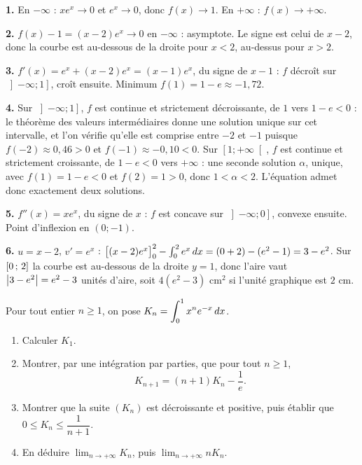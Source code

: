 \begin{corrige}
\textbf{1.} En $-\infty$ : $xe^{x} \to 0$ et $e^{x} \to 0$, donc
$f(x) \to 1$. En $+\infty$ : $f(x) \to +\infty$.

\textbf{2.} $f(x)-1 = (x-2)e^{x} \to 0$ en $-\infty$ : asymptote. Le signe est
celui de $x-2$, donc la courbe est au-dessous de la droite pour $x<2$,
au-dessus pour $x>2$.

\textbf{3.} $f'(x) = e^{x} + (x-2)e^{x} = (x-1)e^{x}$, du signe de $x-1$ :
$f$ décroît sur $\left]-\infty;1\right]$, croît ensuite. Minimum
$f(1) = 1-e \approx -1{,}72$.

\textbf{4.} Sur $\left]-\infty;1\right]$, $f$ est continue et strictement
décroissante, de $1$ vers $1-e < 0$ : le théorème des valeurs intermédiaires
donne une solution unique sur cet intervalle, et l'on vérifie qu'elle est
comprise entre $-2$ et $-1$ puisque $f(-2) \approx 0{,}46 > 0$ et
$f(-1) \approx -0{,}10 < 0$. Sur $\left[1;+\infty\right[$, $f$ est continue et
strictement croissante, de $1-e < 0$ vers $+\infty$ : une seconde solution
$\alpha$, unique, avec $f(1) = 1-e<0$ et $f(2) = 1>0$, donc
$1 < \alpha < 2$. L'équation admet donc exactement deux solutions.

\textbf{5.} $f''(x) = xe^{x}$, du signe de $x$ : $f$ est concave sur
$\left]-\infty;0\right]$, convexe ensuite. Point d'inflexion en $(0;-1)$.

\textbf{6.} $u = x-2$, $v' = e^{x}$ :
$\bigl[(x-2)e^{x}\bigr]_{0}^{2} - \int_{0}^{2}e^{x}\,dx
= (0+2) - (e^{2}-1) = 3-e^{2}$. Sur $\left[0\,;\,2\right]$ la courbe est
au-dessous de la droite $y=1$, donc l'aire vaut
$\left|3-e^{2}\right| = e^{2}-3$ unités d'aire, soit $4(e^{2}-3)$ cm$^{2}$ si l'unité
graphique est $2$ cm.
\end{corrige}

\begin{concours}
Pour tout entier $n \geq 1$, on pose
$\displaystyle K_{n} = \int_{0}^{1} x^{n}e^{-x}\,dx$.

\begin{enumerate}[label=\textbf{\arabic*.}, leftmargin=*, itemsep=0.25em]
  \item Calculer $K_{1}$.
  \item Montrer, par une intégration par parties, que pour tout $n \geq 1$,
        \[
          K_{n+1} = (n+1)K_{n} - \frac{1}{e}.
        \]
  \item Montrer que la suite $(K_{n})$ est décroissante et positive, puis
        établir que $0 \leq K_{n} \leq \dfrac{1}{n+1}$.
  \item En déduire $\displaystyle\lim_{n\to+\infty} K_{n}$, puis
        $\displaystyle\lim_{n\to+\infty} nK_{n}$.
\end{enumerate}
\end{concours}

